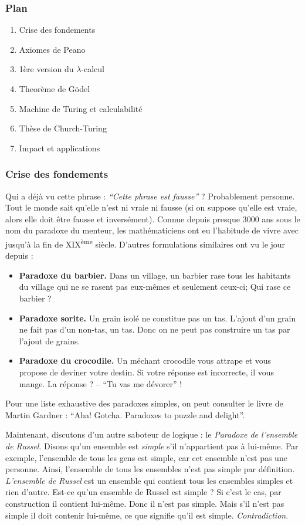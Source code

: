 \documentclass[12pt, a4paper]{article}
\begin{document}
\subsubsection*{Plan}
\begin{enumerate}
	\item Crise des fondements
	\item Axiomes de Peano
	\item 1ère version du $\lambda$-calcul
	\item Theorème de Gödel
	\item Machine de Turing et calculabilité
	\item Thèse de Church-Turing
	\item Impact et applications
\end{enumerate}


\subsubsection*{Crise des fondements}
Qui a déjà vu cette phrase : \emph{``Cette phrase est fausse''} ?
Probablement personne.
Tout le monde sait qu'elle n'est ni vraie ni fausse (si on suppose qu'elle est vraie, alors elle doit être fausse et inversément).
Connue depuis presque 3000 ans sous le nom du paradoxe du menteur, les mathématiciens ont eu l'habitude de vivre avec jusqu'à la fin de XIX\textsuperscript{ème} siècle.
D'autres formulations similaires ont vu le jour depuis :
\begin{itemize}
	\item \textbf{Paradoxe du barbier.}
		Dans un village, un barbier rase tous les habitants du village qui ne se rasent pas eux-mêmes et seulement ceux-ci; Qui rase ce barbier ?
	\item \textbf{Paradoxe sorite.}
		Un grain isolé ne constitue pas un tas.
		L'ajout d'un grain ne fait pas d'un non-tas, un tas.
		Donc on ne peut pas construire un tas par l'ajout de grains.
	\item \textbf{Paradoxe du crocodile.}
		Un méchant crocodile vous attrape et vous propose de deviner votre destin.
		Si votre réponse est incorrecte, il vous mange.
		La réponse ? -- ``Tu vas me dévorer'' !
\end{itemize}

Pour une liste exhaustive des paradoxes simples, on peut consulter le livre de Martin Gardner : ``Aha! Gotcha. Paradoxes to puzzle and delight''.

Maintenant, discutons d'un autre saboteur de logique : le \emph{Paradoxe de l'ensemble de Russel}.
Disons qu'un ensemble est \emph{simple} s'il n'appartient pas à lui-même. Par exemple, l'ensemble de tous les gens est simple, car cet ensemble n'est pas une personne. Ainsi, l'ensemble de tous les ensembles n'est pas simple par définition. \emph{L'ensemble de Russel} est un ensemble qui contient tous les ensembles simples et rien d'autre.
Est-ce qu'un ensemble de Russel est simple ? Si c'est le cas, par construction il contient lui-même. Donc il n'est pas simple. Mais s'il n'est pas simple il doit contenir lui-même, ce que signifie qu'il est simple. \emph{Contradiction}.
\end{document}
